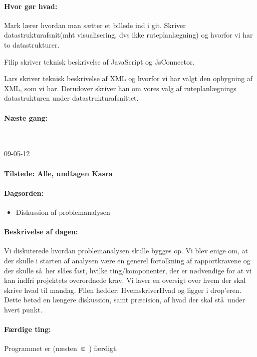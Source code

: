 \documentclass[a4paper,10pt,titlepage]{article}
\begin{document}
		\paragraph{Hvor g\o r hvad:}
		Mark l\ae rer hvordan man s\ae tter et billede ind i git. Skriver datastrukturafsnit(mht visualisering, dvs ikke ruteplanl\ae gning) og hvorfor vi har to datastrukturer.

Filip skriver teknisk beskrivelse af JavaScript og JsConnector.

Lars skriver teknisk beskrivelse af XML og hvorfor vi har valgt den opbygning af XML, som vi har. Derudover skriver han om vores valg af ruteplanl\ae gnings datastrukturen under datastrukturafsnittet.

		\paragraph{N\ae ste gang:}\mbox{}\\
		
		\begin{center}
		09-05-12
		\end{center}
		
		\paragraph{Tilstede: Alle, undtagen Kasra}
		\paragraph{Dagsorden:}
		\begin{itemize}
					\item Diskussion af problemanalysen
		\end{itemize}
		
		\paragraph{Beskrivelse af dagen:}
		Vi diskuterede hvordan problemanalysen skulle bygges op.  Vi blev enige om, at der skulle i starten af analysen v\ae re en generel fortolkning af rapportkravene og der skulle s\aa \ her sl\aa es fast, hvilke ting/komponenter, der er n\o dvendige for at vi kan indfri projektets overordnede krav. 
Vi laver en oversigt over hvem der skal skrive hvad til mandag. Filen hedder: HvemskriverHvad og ligger i drop’eren. Dette bet\o d en l\ae ngere diskussion, samt pr\ae cision, af hvad der skal st\aa \ under hvert punkt. 

		\paragraph{F\ae rdige ting:}
		Programmet er (n\ae sten ☺ ) f\ae rdigt. 
\end{document}
